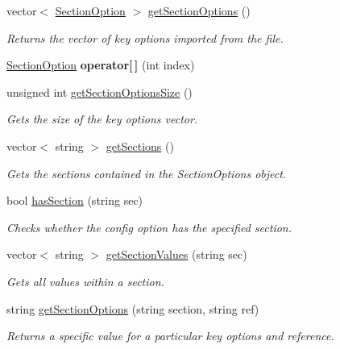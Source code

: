 \begin{DoxyCompactItemize}
\item 
vector$<$ \hyperlink{struct_section_option}{Section\+Option} $>$ \hyperlink{class_config_option_ab106a54b3555a0192a1651116578a80d}{get\+Section\+Options} ()
\begin{DoxyCompactList}\small\item\em Returns the vector of key options imported from the file. \end{DoxyCompactList}\item 
\hyperlink{struct_section_option}{Section\+Option} {\bfseries operator\mbox{[}$\,$\mbox{]}} (int index)\hypertarget{class_config_option_a66d2199cf3bd4fa015ef38e34fe02bd1}{}\label{class_config_option_a66d2199cf3bd4fa015ef38e34fe02bd1}

\item 
unsigned int \hyperlink{class_config_option_acb7b9141efc8d0e50e21ff1adce8e9cb}{get\+Section\+Options\+Size} ()
\begin{DoxyCompactList}\small\item\em Gets the size of the key options vector. \end{DoxyCompactList}\item 
vector$<$ string $>$ \hyperlink{class_config_option_ab32e6555e331e499b8071722885e9bc6}{get\+Sections} ()
\begin{DoxyCompactList}\small\item\em Gets the sections contained in the Section\+Options object. \end{DoxyCompactList}\item 
bool \hyperlink{class_config_option_a283504b26f0a4e79c1ea28045ac765ba}{has\+Section} (string sec)
\begin{DoxyCompactList}\small\item\em Checks whether the config option has the specified section. \end{DoxyCompactList}\item 
vector$<$ string $>$ \hyperlink{class_config_option_a7558ac5aaee81415034d28aea7485f0b}{get\+Section\+Values} (string sec)
\begin{DoxyCompactList}\small\item\em Gets all values within a section. \end{DoxyCompactList}\item 
string \hyperlink{class_config_option_a36917196846e64db6634730fa9b2b3f3}{get\+Section\+Options} (string section, string ref)
\begin{DoxyCompactList}\small\item\em Returns a specific value for a particular key options and reference. \end{DoxyCompactList}\item 

\end{DoxyCompactItemize}
